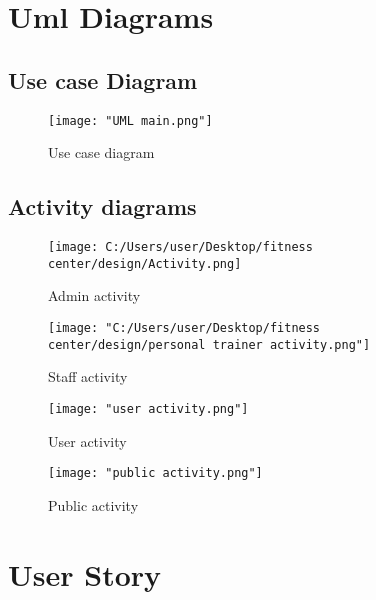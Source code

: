 \documentclass[a4paper,12pt,toc=flat]{report}
\begin{document}
{{	
	\section{Uml Diagrams}
	\subsection{Use case Diagram}
	\begin{figure}[bph]
		\begin{center}
			\texttt{[image: "UML main.png"]}
		\end{center}
		\caption{Use case diagram}
	\end{figure}
	\pagebreak
	\subsection{Activity diagrams}
	\begin{figure}[bph]
		\begin{center}
			\texttt{[image: C:/Users/user/Desktop/fitness center/design/Activity.png]}
		\end{center}
		\caption{Admin activity}
	\end{figure}
	\begin{figure}[bph]
		\begin{center}
			\texttt{[image: "C:/Users/user/Desktop/fitness center/design/personal trainer activity.png"]}
		\end{center}
		\caption{Staff activity}
	\end{figure}
	\begin{figure}[bph]
		\begin{center}
			\texttt{[image: "user activity.png"]}
		\end{center}
		\caption{User activity}
	\end{figure}
	\begin{figure}[bph]
		\begin{center}
			\texttt{[image: "public activity.png"]}
		\end{center}
		\caption{Public activity}
	\end{figure}
	\pagebreak
	
	\section{User Story}
	\begin{center}
		

\end{center}}}
\end{document}
